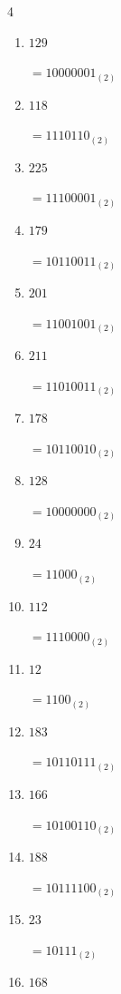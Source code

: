 \begin{multicols}{4}
\begin{enumerate}
        $=10000001_{(2)}$

  \item $129$

        $=10000001_{(2)}$

  \item $118$

        $=1110110_{(2)}$

  \item $225$

        $=11100001_{(2)}$

  \item $179$

        $=10110011_{(2)}$

  \item $201$

        $=11001001_{(2)}$

  \item $211$

        $=11010011_{(2)}$

  \item $178$

        $=10110010_{(2)}$

\columnbreak %

  \item $128$

        $=10000000_{(2)}$

  \item $24$

        $=11000_{(2)}$

  \item $112$

        $=1110000_{(2)}$

  \item $12$

        $=1100_{(2)}$

  \item $183$

        $=10110111_{(2)}$

  \item $166$

        $=10100110_{(2)}$

  \item $188$

        $=10111100_{(2)}$

  \item $23$

        $=10111_{(2)}$

  \item $168$


\end{enumerate}
\end{multicols}
